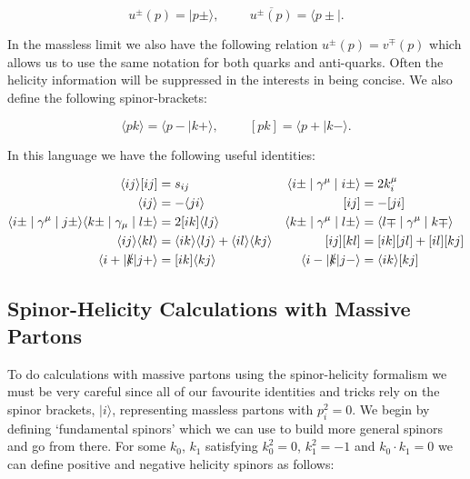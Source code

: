 	\begin{equation}
		u^\pm(p) = \mid p\pm\rangle, \hspace{1cm} \overline{u^\pm(p)} = \langle p\pm\mid.
	\end{equation}

	In the massless limit we also have the following relation $u^\pm(p) = v^\mp(p)$ which allows us to use the same notation for both
	quarks and anti-quarks.  Often the helicity information will be suppressed in the interests in being concise.  We also define the
	following spinor-brackets:

	\begin{equation}
		\langle pk\rangle = \langle p-\mid k+\rangle, \hspace{1cm} [pk] = \langle p+\mid k-\rangle.
	\end{equation}

	In this language we have the following useful identities:

	\begin{align*}
		\langle ij\rangle[ij] &= s_{ij} & \langle i\pm\mid\gamma^\mu\mid i\pm\rangle &= 2k_i^\mu \\
		\langle ij\rangle &= -\langle ji\rangle & [ij] &= -[ji] \\
		\langle i\pm\mid\gamma^\mu\mid j\pm\rangle\langle k\pm\mid\gamma_\mu\mid l\pm\rangle &=
		2[ik]\langle l j\rangle & \langle k\pm\mid\gamma^\mu\mid l\pm\rangle &=
		\langle l\mp\mid\gamma^\mu\mid k\mp\rangle \\
		\langle i j\rangle\langle k l\rangle &=
		\langle i k\rangle\langle l j\rangle + \langle i l\rangle\langle k j\rangle & [ij][kl] &= [ik][jl]+[il][kj] \\
		\langle i+|\slashed k|j+\rangle &= [ik]\langle kj\rangle & \langle i-|\slashed k|j-\rangle &= \langle ik\rangle [kj]
	\end{align*}

	\subsection{Spinor-Helicity Calculations with Massive Partons}
		\label{sub:SMMassive}

		To do calculations with massive partons using the spinor-helicity formalism we must be very careful since all of our favourite
		identities and tricks rely on the spinor brackets, $|i\rangle$, representing massless partons with $p_i^2=0$. We begin by
		defining `fundamental spinors' \cite{Thesis} which we can use to build more general spinors and go from there.
		For some $k_0$, $k_1$ satisfying $k_0^2=0$, $k_1^2=-1$ and $k_0\cdot k_1=0$ we can define positive and negative helicity spinors as follows:

